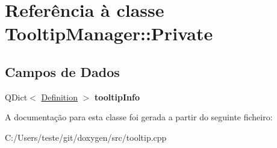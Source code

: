 \hypertarget{class_tooltip_manager_1_1_private}{\section{Referência à classe Tooltip\-Manager\-:\-:Private}
\label{class_tooltip_manager_1_1_private}
}
\subsection*{Campos de Dados}
\begin{DoxyCompactItemize}
\item 
\hypertarget{class_tooltip_manager_1_1_private_af46a24411632df2a138ae2193c48a823}{Q\-Dict$<$ \hyperlink{class_definition}{Definition} $>$ {\bfseries tooltip\-Info}}\label{class_tooltip_manager_1_1_private_af46a24411632df2a138ae2193c48a823}

\end{DoxyCompactItemize}


A documentação para esta classe foi gerada a partir do seguinte ficheiro\-:\begin{DoxyCompactItemize}
\item 
C\-:/\-Users/teste/git/doxygen/src/tooltip.\-cpp\end{DoxyCompactItemize}
